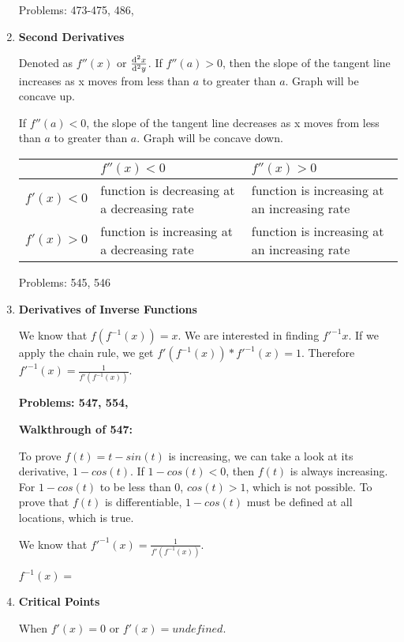 \documentclass[11pt,twoside]{article}
\begin{document}
\begin{enumerate}
Problems: 473-475, 486, 

\item \textbf{Second Derivatives}

Denoted as $f''(x)$ or $\frac{\odif[order={2}]{x}}{\odif[order={2}]{y}}$. 
If $f''(a) > 0$, then the slope of the tangent line increases as x moves from less than $a$ to greater than $a$. Graph will be concave up.

If $f''(a) < 0$, the slope of the tangent line decreases as x moves from less than $a$ to greater than $a$. Graph will be concave down.

\begin{center}
\begin{tabularx}{0.8\textwidth} {
| >{\raggedright\arraybackslash}X 
| >{\centering\arraybackslash}X 
| >{\raggedleft\arraybackslash}X |}
\hline
& $f''(x) < 0$ & $f''(x) > 0$ \\
\hline
$f'(x) < 0$ & function is decreasing at a decreasing rate & function is increasing at an increasing rate\\ 
\hline
$f'(x) > 0$ & function is increasing at a decreasing rate & function is increasing at an increasing rate \\
\hline
\end{tabularx}
\end{center}

Problems: 545, 546

\item \textbf{Derivatives of Inverse Functions}

We know that $f(f^{-1}(x)) = x$. We are interested in finding $f'^{-1}x$. If we apply the chain rule, we get $f'(f^{-1}(x)) * f'^{-1}(x) = 1$. Therefore
$f'^{-1}(x) = \frac{1}{f'(f^{-1}(x))}$.

\textbf{Problems: 547, 554,} 

\textbf{Walkthrough of 547:}

To prove $f(t) = t - sin(t)$ is increasing, we can take a look at its derivative, $1 - cos(t)$. If $1 - cos(t) < 0$, then $f(t)$ is always increasing. For $1 - cos(t)$ to be less than 0, $cos(t) > 1$, which is not possible. To prove that $f(t)$ is differentiable, $1 - cos(t)$ must be defined at all locations, which is true.  

We know that $f'^{-1}(x) = \frac{1}{f'(f^{-1}(x))}$.

$f^{-1}(x) = $

\item \textbf{Critical Points}

When $f'(x) = 0$ or $f'(x) = undefined$. 


\end{enumerate}
\end{document}
